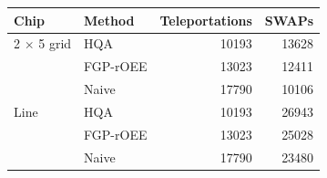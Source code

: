 \begin{tabular}{llrr}
\toprule
Chip & Method & Teleportations & SWAPs \\
\midrule
2 $\times$ 5 grid & HQA & 10193 & 13628 \\
 & FGP-rOEE & 13023 & 12411 \\
 & Naive & 17790 & 10106 \\
\midrule
Line & HQA & 10193 & 26943 \\
 & FGP-rOEE & 13023 & 25028 \\
 & Naive & 17790 & 23480 \\
\bottomrule
\end{tabular}
